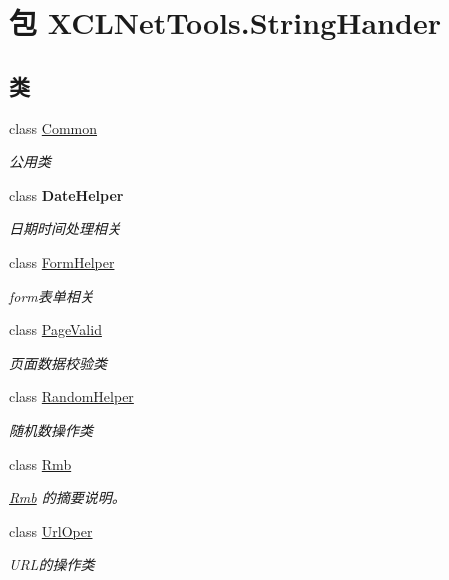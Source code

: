 \hypertarget{namespace_x_c_l_net_tools_1_1_string_hander}{\section{包 X\-C\-L\-Net\-Tools.\-String\-Hander}
\label{namespace_x_c_l_net_tools_1_1_string_hander}
}
\subsection*{类}
\begin{DoxyCompactItemize}
\item 
class \hyperlink{class_x_c_l_net_tools_1_1_string_hander_1_1_common}{Common}
\begin{DoxyCompactList}\small\item\em 公用类 \end{DoxyCompactList}\item 
class {\bfseries Date\-Helper}
\begin{DoxyCompactList}\small\item\em 日期时间处理相关 \end{DoxyCompactList}\item 
class \hyperlink{class_x_c_l_net_tools_1_1_string_hander_1_1_form_helper}{Form\-Helper}
\begin{DoxyCompactList}\small\item\em form表单相关 \end{DoxyCompactList}\item 
class \hyperlink{class_x_c_l_net_tools_1_1_string_hander_1_1_page_valid}{Page\-Valid}
\begin{DoxyCompactList}\small\item\em 页面数据校验类 \end{DoxyCompactList}\item 
class \hyperlink{class_x_c_l_net_tools_1_1_string_hander_1_1_random_helper}{Random\-Helper}
\begin{DoxyCompactList}\small\item\em 随机数操作类 \end{DoxyCompactList}\item 
class \hyperlink{class_x_c_l_net_tools_1_1_string_hander_1_1_rmb}{Rmb}
\begin{DoxyCompactList}\small\item\em \hyperlink{class_x_c_l_net_tools_1_1_string_hander_1_1_rmb}{Rmb} 的摘要说明。 \end{DoxyCompactList}\item 
class \hyperlink{class_x_c_l_net_tools_1_1_string_hander_1_1_url_oper}{Url\-Oper}
\begin{DoxyCompactList}\small\item\em U\-R\-L的操作类 \end{DoxyCompactList}\end{DoxyCompactItemize}
